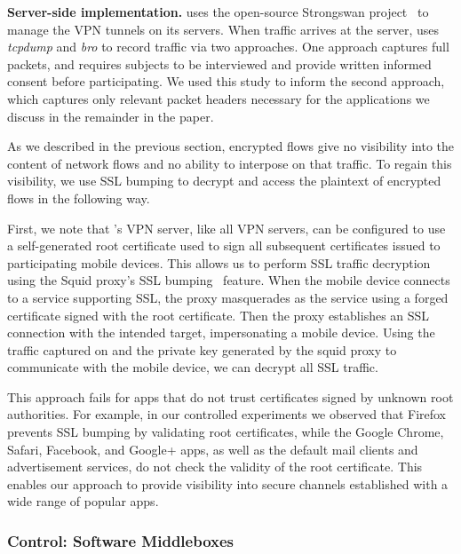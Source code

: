 \noindent\textbf{Server-side implementation.} 
\meddle uses the open-source Strongswan project~\cite{strongswan} to manage the VPN tunnels 
on its servers. When traffic arrives at the server, \meddle uses \emph{tcpdump} and \emph{bro} to record 
traffic via two approaches. One approach captures full packets, 
and requires subjects to be interviewed and provide written informed consent before participating. 
We used this study to inform the second approach, which captures only relevant packet headers 
necessary for the applications we discuss in the remainder in the paper. 

As we described in the previous section, encrypted flows give \meddle no visibility into the 
content of network flows and no ability to interpose on that traffic. To regain this visibility, we use SSL 
bumping to decrypt and access the plaintext of encrypted flows in the following way. 
 
First, we note that \meddle's VPN server, like all VPN servers, can be configured to use a self-generated root certificate used to sign all subsequent certificates issued to participating mobile devices. 
This allows us to perform SSL traffic decryption using the Squid proxy's SSL bumping~\cite{sslbump} feature.
When the mobile device connects to a service supporting SSL, the proxy masquerades as the service using a forged certificate signed with the \meddle root certificate. 
Then the proxy establishes an SSL connection with the intended target, impersonating a mobile device. 
Using the traffic captured on \meddle and the private key generated by the squid proxy to communicate with the mobile device, we can decrypt all SSL traffic. 

This approach fails for apps that do not trust certificates signed by unknown root authorities. 
For example, in our controlled experiments we observed that Firefox prevents SSL bumping by validating root certificates, while the Google Chrome, Safari, Facebook, and Google+ apps, as well as the default mail clients and advertisement services, do not check the validity of the root certificate. 
This enables our approach to provide visibility into secure channels established with a wide range of popular apps. 


\subsubsection{Control: Software Middleboxes}
\label{subsec:design_control}

